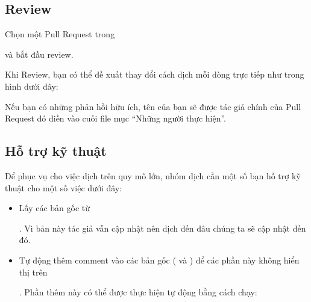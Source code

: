\documentclass[letterpaper,11pt,english]{sphinxmanual}
\begin{document}
\subsection{Review}
\label{\detokenize{intro_vn:review}}
Chọn một Pull Request trong %
\begin{footnote}[13]\sphinxAtStartFootnote
{}
%
\end{footnote} và bắt đầu review.

Khi Review, bạn có thể đề xuất thay đổi cách dịch mỗi dòng trực tiếp như
trong hình dưới đây: \begin{center}\end{center}

Nếu bạn có những phản hồi hữu ích, tên của bạn sẽ được tác giả chính của
Pull Request đó điền vào cuối file mục “Những người thực hiện”.


\subsection{Hỗ trợ kỹ thuật}
\label{\detokenize{intro_vn:ho-tro-ky-thuat}}
Để phục vụ cho việc dịch trên quy mô lớn, nhóm dịch cần một số bạn hỗ
trợ kỹ thuật cho một số việc dưới đây:
\begin{itemize}
\item {} 
Lấy các bản gốc từ %
\begin{footnote}[14]\sphinxAtStartFootnote
{}
%
\end{footnote}. Vì bản này tác
giả vẫn cập nhật nên dịch đến đâu chúng ta sẽ cập nhật đến đó.

\item {} 
Tự động thêm comment vào các bản gốc (\sphinxcode{\sphinxupquote{\textless{}!-{-}}} và \sphinxcode{\sphinxupquote{-{-}\textgreater{}}}) để các
phần này không hiển thị trên %
\begin{footnote}[15]\sphinxAtStartFootnote
{}
%
\end{footnote}. Phần thêm này có thể được thực
hiện tự động bằng cách chạy:

\end{itemize}

\begin{sphinxVerbatim}[commandchars=\\\{\}]
   
\end{sphinxVerbatim}
\end{document}
